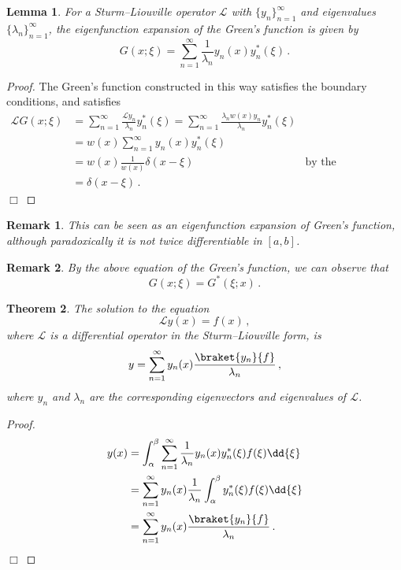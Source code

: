 \documentclass{article}
\theoremstyle{plain}\theoremheaderfont{\normalfont\itshape}\theorembodyfont{\rmfamily}\theoremseparator{.}\newtheorem*{rem}{Remark}\newtheorem*{ex}{Example}\newtheorem*{proof}{Proof}\newtheorem*{altp}{Alternative proof}
\theoremstyle{plain}\theoremheaderfont{\normalfont\bfseries}\theorembodyfont{\rmfamily}\theoremseparator{.}\newtheorem{thm}{Theorem}[section]\newtheorem{lem}[thm]{Lemma}\newtheorem{prop}[thm]{Proposition}\newtheorem*{cor}{Corollary}\newtheorem{defn}[thm]{Definition}\newtheorem{clm}[thm]{Claim}\newtheorem{clminproof}{Claim}
\theoremstyle{break}\theoremheaderfont{\normalfont\itshape}\theorembodyfont{\rmfamily}\theoremseparator{.\medskip}\newtheorem*{proofskip}{Proof}\newtheorem*{exs}{Examples}\newtheorem*{rems}{Remarks}
\theoremstyle{break}\theoremheaderfont{\normalfont\bfseries}\theorembodyfont{\rmfamily}\theoremseparator{.\medskip}\newtheorem{lemskip}[thm]{Lemma}\newtheorem{defnskip}[thm]{Definition}\newtheorem{propskip}[thm]{Proposition}\newtheorem{thmskip}[thm]{Theorem}
\numberwithin{equation}{section}
\newcommand{\qed}{\hfill\ensuremath{\Box}}
\begin{document}
	\begin{lem}
		For a Sturm--Liouville operator \(\mathcal{L}\) with \(\{y_n\}_{n=1}^{\infty}\) and eigenvalues \(\{\lambda_n\}_{n=1}^{\infty}\), the eigenfunction expansion of the Green's function is given by
		\[G(x;\xi)=\sum_{n=1}^{\infty}\frac{1}{\lambda_n}y_n(x)y_n^*(\xi)\,.\]
	\end{lem}

	\begin{proof}
		The Green's function constructed in this way satisfies the boundary conditions, and satisfies
		\begin{align*}
			\mathcal{L}G(x;\xi)&=\sum_{n=1}^{\infty}\frac{\mathcal{L}y_n}{\lambda_n}y_n^*(\xi)=\sum_{n=1}^{\infty}\frac{\lambda_n w(x)y_n}{\lambda_n}y_n^*(\xi)\\
			&=w(x)\sum_{n=1}^{\infty}y_n(x)y_n^*(\xi)\\
			&=w(x)\frac{1}{w(x)}\delta(x-\xi) &\text{by the completeness relation}&\\
			&=\delta(x-\xi)\,.
		\end{align*}\qed
	\end{proof}
	\begin{rem}
		This can be seen as an eigenfunction expansion of Green's function, although paradoxically it is not twice differentiable in \([a,b]\).
	\end{rem}
	\begin{rem}
		By the above equation of the Green's function, we can observe that
		\[G(x;\xi)=G^*(\xi;x)\,.\]
	\end{rem}

	\begin{thm}
		The solution to the equation
		\[\mathcal{L}y(x)=f(x)\,,\]
		where \(\mathcal{L}\) is a differential operator in the Sturm--Liouville form, is
		\[y=\sum_{n=1}^{\infty}y_n(x)\frac{\braket{y_n}{f}}{\lambda_n}\,,\]
		where \(y_n\) and \(\lambda_n\) are the corresponding eigenvectors and eigenvalues of \(\mathcal{L}\).
	\end{thm}
	\begin{proof}
		\begin{align*}
			y(x)&=\int_{\alpha}^{\beta}\sum_{n=1}^{\infty}\frac{1}{\lambda_n}y_n(x)y_n^*(\xi)f(\xi)\dd{\xi}\\
			&=\sum_{n=1}^{\infty}y_n(x)\frac{1}{\lambda_n}\int_{\alpha}^{\beta}y_n^*(\xi)f(\xi)\dd{\xi}\\
			&=\sum_{n=1}^{\infty}y_n(x)\frac{\braket{y_n}{f}}{\lambda_n}\,.
		\end{align*}\qed
	\end{proof}
\end{document}
